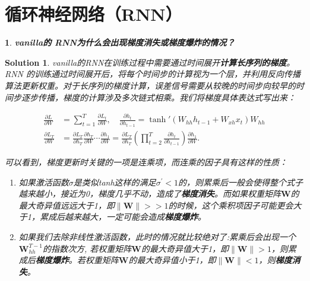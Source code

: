\documentclass{article}
\title{\Huge\Assignment}
\author{\ID \Name \quad\href{mailto:tianym2022@smail.nju.edu.cn}{\color{magenta}\Email}}
\date{\today}
\theoremstyle{Problem}
\newtheorem{prob}[subsection]{}
\theoremstyle{Solution}
\newtheorem*{sol}{Solution}
\begin{document}
	\maketitle
	
	\section{循环神经网络（RNN）}
	\begin{prob}
		\textbf{vanilla的 RNN为什么会出现梯度消失或梯度爆炸的情况？} \label{1}
	\end{prob}
	\begin{sol}
		vanilla的RNN在训练过程中需要通过时间展开\textbf{计算长序列的梯度}。RNN 的训练通过时间展开后，将每个时间步的计算视为一个层，并利用反向传播算法更新权重。对于长序列的梯度计算，误差信号需要从较晚的时间步向较早的时间步逐步传播，梯度的计算涉及多次链式相乘。我们将梯度具体表达式写出来：
		
		\begin{align*}
			\frac{\partial L}{\partial W} &= \sum_{t=1}^T \frac{\partial L_t}{\partial W}, \quad \frac{\partial h_t}{\partial h_{t-1}} = \tanh'\left(W_{hh} h_{t-1} + W_{xh} x_t\right) W_{hh} \\
			\frac{\partial L_T}{\partial W} &= \frac{\partial L_T}{\partial h_T} \frac{\partial h_T}{\partial W} \cdots \frac{\partial h_1}{\partial W} = \frac{\partial L_T}{\partial h_T} \left(\prod_{t=2}^T \frac{\partial h_t}{\partial h_{t-1}}\right) \frac{\partial h_1}{\partial W}.
		\end{align*}
		
		可以看到，梯度更新时关键的一项是连乘项，而连乘的因子具有这样的性质：
		
		\begin{enumerate}
			\item 如果激活函数$\sigma$是类似tanh这样的满足$\sigma^\prime < 1$的，则累乘后一般会使得整个式子越来越小，接近为0，梯度几乎不动，造成了\textbf{梯度消失}。而如果权重矩阵$\mathbf{W}$的最大奇异值远远大于1，即$\|\mathbf{W}\| >> 1$的时候，这个乘积项因子可能更会大于1，累成后越来越大，一定可能会造成\textbf{梯度爆炸}。
			\item 如果我们去除非线性激活函数，此时的情况就比较绝对了:累乘后会出现一个$\mathbf{W}_{hh}^{T-1}$的指数次方, 若权重矩阵$\mathbf{W}$的最大奇异值大于1，即$\|\mathbf{W}\| > 1$，则累成后\textbf{梯度爆炸}。若权重矩阵$\mathbf{W}$的最大奇异值小于1，即$\|\mathbf{W}\| < 1$，则\textbf{梯度消失}。
		\end{enumerate}
	\end{sol}
	
\end{document}
